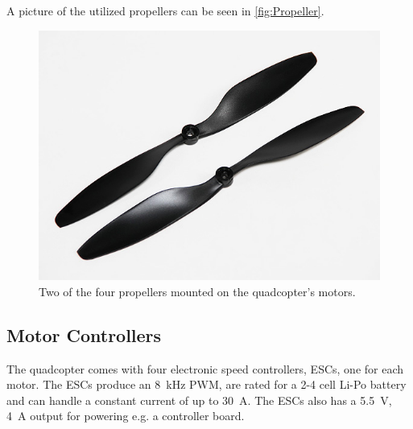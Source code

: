 A picture of the utilized propellers can be seen in \autoref{fig:Propeller}.

\begin{figure}[H]
	\centering
	\includegraphics[scale=0.4]{figures/propeller.png}
	\caption{Two of the four propellers mounted on the quadcopter's motors.\cite{HkingPropeller}}
	\label{fig:Propeller}
\end{figure}



\subsection{Motor Controllers}
The quadcopter comes with four electronic speed controllers, ESCs, one for each motor. The ESCs produce an \SI{8}{kHz} PWM, are rated for a 2-4 cell Li-Po battery and can handle a constant current of up to \SI{30}{A}. The ESCs also has a \SI{5.5}{V}, \SI{4}{A} output for powering e.g. a controller board.\cite{HKing}

